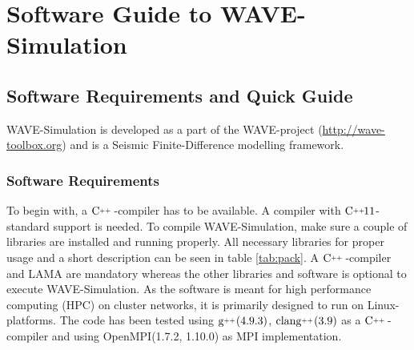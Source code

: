 \documentclass[pdftex,a4paper,parskip,listof=totoc,bibliography=totoc,onehalfspacing,12pt]{scrreprt}
\newcommand{\CC}[1][]{$\text{C\hspace{0ex}}^{_{_{_{++}}}}					%
                      \ifthenelse{\equal{#1}{}}{}{\text{\hspace{-.625ex}#1}}$}
\newcommand{\clang}[1][]{$\text{clang\hspace{0ex}}^{_{_{_{++}}}}		%
                      \ifthenelse{\equal{#1}{}}{}{\text{\hspace{-.25ex}(#1)}}$}
\newcommand{\gCC}[1][]{$\text{g\hspace{0ex}}^{_{_{_{++}}}}				%
                      \ifthenelse{\equal{#1}{}}{}{\text{\hspace{-.25ex}(#1)}}$}
\begin{document}
\part{Software Guide to WAVE-Simulation}
\chapter{Software Requirements and Quick Guide}

WAVE-Simulation is developed as a part of the WAVE-project (\url{http://wave-toolbox.org}) and is a Seismic Finite-Difference modelling framework. 

\section{Software Requirements}

To begin with, a \CC-compiler has to be available. A compiler with  \CC[11]-standard support is needed. To compile WAVE-Simulation, make sure a couple of libraries are installed and running properly. All necessary libraries for proper usage and a short description can be seen in table \ref{tab:pack}. A \CC-compiler and LAMA are mandatory whereas the other libraries and software is optional to execute WAVE-Simulation.
As the software is meant for high performance computing (HPC) on cluster networks, it is primarily designed to run on Linux-platforms. The code has been tested using \gCC[4.9.3], \clang[3.9] as a  \CC-compiler and using OpenMPI(1.7.2, 1.10.0) as MPI implementation.
\end{document}
